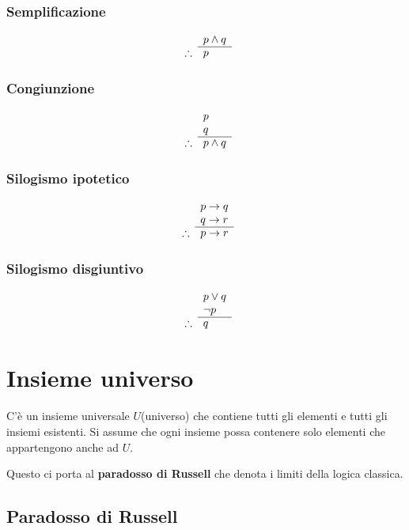 \documentclass[a4paper]{article}
\begin{document}
\subsubsection{Semplificazione}
\[
\begin{array}{ r l }
	& p \land q \\
	\cline{2-2}
	\therefore & p
\end{array}
\]

\subsubsection{Congiunzione}
\[
\begin{array}{ r l }
	& p \\
	& q \\
	\cline{2-2}
	\therefore & p \land q
\end{array}
\]

\subsubsection{Silogismo ipotetico}
\[
\begin{array}{ r l }
	& p \rightarrow q \\
	& q \rightarrow r \\
	\cline{2-2}
	\therefore & p \rightarrow r
\end{array}
\]

\subsubsection{Silogismo disgiuntivo}
\[
\begin{array}{ r l }
	& p \lor q \\
	& \neg p \\
	\cline{2-2}
	\therefore & q
\end{array}
\]

\section{Insieme universo}

C'è un insieme universale $U$(universo) che contiene tutti gli elementi e tutti gli insiemi esistenti. Si assume che ogni insieme possa contenere solo elementi che appartengono anche ad $U$.

Questo ci porta al \textbf{paradosso di Russell} che denota i limiti della logica classica.

\subsection{Paradosso di Russell}
\end{document}
